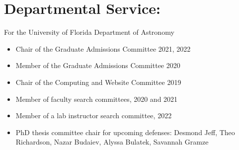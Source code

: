 
\begin{minipage}{\textwidth}
\setlength{\extrarowheight}{4pt}

\section*{Departmental Service:}
\vspace{-10pt}
For the University of Florida Department of Astronomy
\begin{itemize}
\itemsep-3pt
\item Chair of the Graduate Admissions Committee 2021, 2022
\item Member of the Graduate Admissions Committee 2020
\item Chair of the Computing and Website Committee 2019
\item Member of faculty search committees, 2020 and 2021
\item Member of a lab instructor search committee, 2022
\item PhD thesis committee chair for upcoming defenses: Desmond Jeff, Theo Richardson, Nazar Budaiev, Alyssa Bulatek, Savannah Gramze
\end{itemize}
\end{minipage}
\vspace{4mm}
